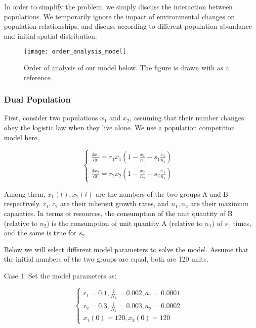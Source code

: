 \documentclass{mcmthesis}
\begin{document}
In order to simplify the problem, we simply discuss the interaction between populations. We temporarily ignore the impact of environmental changes on population relationships, and discuss according to different population abundance and initial spatial distribution. 

\begin{figure}[H]
  \small
  \centering
  \texttt{[image: order\_analysis\_model]}
  \caption{Order of analysis of our model below. The figure is drawn with \cite{hiscox2018fungus} as a reference.}
  \label{order_analysis_model}
\end{figure}

\subsubsection{Dual Population}

First, consider two populations $ x_1 $ and $ x_2 $, assuming that their number changes obey the logistic law when they live alone. We use a population competition model here.

\begin{equation}
  \left\{ \begin{array}{l} \frac{\mathrm{d} x_1}{\mathrm{d} t}=r_{1} x_1\left(1-\frac{x_1}{n_{1}}-s_{1} \frac{x_2}{n_{2}}\right)\\ \frac{\mathrm{d} x_2}{\mathrm{d} t}=r_{2} x_2\left(1-\frac{x_2}{n_{2}}-s_{2} \frac{x_1}{n_{1}}\right) \end{array} \right.
  \label{alg_31}
\end{equation}

Among them, $ x_1(t), x_2(t) $ are the numbers of the two groups A and B respectively. $ r_1, r_2 $ are their inherent growth rates, and $ n_1, n_2 $ are their maximum capacities. In terms of resources, the consumption of the unit quantity of B (relative to $n_2$) is the consumption of unit quantity A (relative to $n_1$) of $s_1$ times, and the same is true for $s_2$. 

Below we will select different model parameters to solve the model. Assume that the initial numbers of the two groups are equal, both are 120 units. 

Case 1: Set the model parameters as: 

\begin{equation}
  \left\{\begin{array}{l}
    r_{1}=0.1, \frac{1}{N_{1}}=0.002, a_{1}=0.0001 \\
    r_{2}=0.3, \frac{1}{N_{2}}=0.003, a_{2}=0.0002 \\
    x_{1}(0)=120, x_{2}(0)=120
    \end{array}\right.
  \label{alg_32}
\end{equation}
\end{document}
